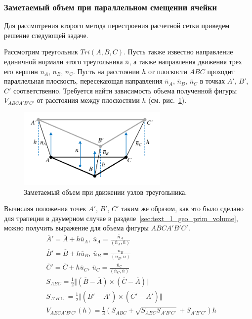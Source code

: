 \subsubsection{Заметаемый объем при параллельном смещении ячейки}

Для рассмотрения второго метода перестроения расчетной сетки приведем решение следующей задаче.

Рассмотрим треугольник $Tri(A, B, C)$.
Пусть также известно направление единичной нормали этого треугольника $\overline{n}$, а также направления движения трех его вершин $\overline{n}_A$, $\overline{n}_B$, $\overline{n}_C$.
Пусть на расстоянии $h$ от плоскости $ABC$ проходит параллельная плоскость, пересекающая направления $\overline{n}_A$, $\overline{n}_B$, $\overline{n}_C$ в точках $A'$, $B'$, $C'$ соответственно.
Требуется найти зависимость объема полученной фигуры $V_{ABCA'B'C'}$ от расстояния между плоскостями $h$ (см. рис.~\ref{fig:text_1_geo_prim_pyramid_partial}).

\begin{figure}[ht]
\centering
\includegraphics[width=0.65\textwidth]{./fig/3dr_pyramid_partial.pdf}
\singlespacing
{}\caption{Заметаемый объем при движении узлов треугольника.}
\label{fig:text_1_geo_prim_pyramid_partial}
\end{figure}

Вычисляя положения точек $A'$, $B'$, $C'$ таким же образом, как это было сделано для трапеции в двумерном случае в разделе~\ref{sec:text_1_geo_prim_volume}, можно получить выражение для объема фигуры $ABCA'B'C'$.
\begin{equation}\label{eqn:text_1_geo_prim_abca1b1c1}
	\begin{aligned}
		& \overline{A}' = \overline{A} + h \overline{u}_A, \ \overline{u}_A = \frac{\overline{n}_A}{(\overline{n}_A, \overline{n})} \\
		& \overline{B}' = \overline{B} + h \overline{u}_B, \ \overline{u}_B = \frac{\overline{n}_B}{(\overline{n}_B, \overline{n})} \\
		& \overline{C}' = \overline{C} + h \overline{u}_C, \ \overline{u}_C = \frac{\overline{n}_C}{(\overline{n}_C, \overline{n})} \\
		& S_{ABC} = \frac{1}{2} \Vert (\overline{B} - \overline{A}) \times (\overline{C} - \overline{A}) \Vert \\
		& S_{A'B'C'} = \frac{1}{2} \Vert (\overline{B'} - \overline{A'}) \times (\overline{C'} - \overline{A'}) \Vert \\
		& V_{ABCA'B'C'}(h) = \frac{1}{3} \left( S_{ABC} + \sqrt{S_{ABC} S_{A'B'C'}} + S_{A'B'C'} \right) h
	\end{aligned}
\end{equation}

